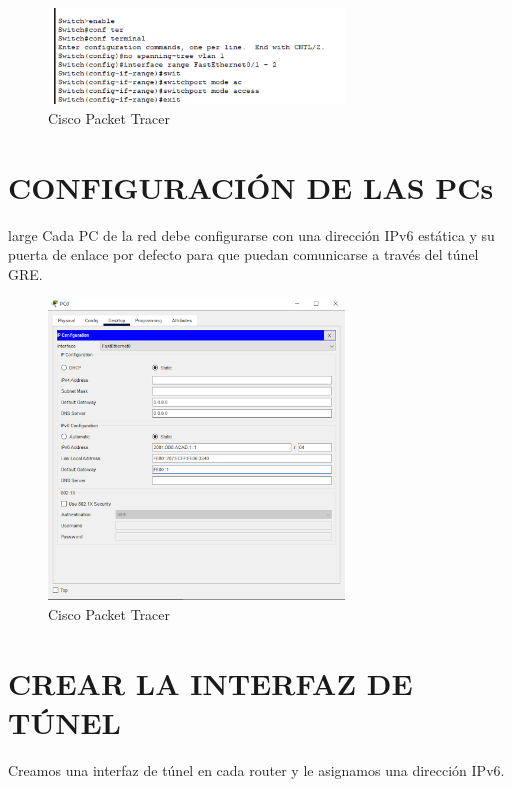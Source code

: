 \documentclass[12pt]{article}
\begin{document}
	\begin{figure}[h!]
		\centering
		\includegraphics[width=0.7\textwidth]{../tpipv6-2/imagenes/stpsw0}
		\caption{Cisco Packet Tracer}
	\end{figure}
	
	\newpage
	
	\section{CONFIGURACIÓN DE LAS PCs}
	{large Cada PC de la red debe configurarse con una dirección IPv6 estática y su puerta de enlace por defecto para que puedan comunicarse a través del túnel GRE.}
	
	\begin{figure}[h!]
		\centering
		\includegraphics[width=0.7\textwidth]{../tpipv6-2/imagenes/confipv6pc0}
		\caption{Cisco Packet Tracer}
	\end{figure}
	
	\newpage
	
	\section{CREAR LA INTERFAZ DE TÚNEL}
	{\large Creamos una interfaz de túnel en cada router y le asignamos una dirección IPv6.}
	
\end{document}

